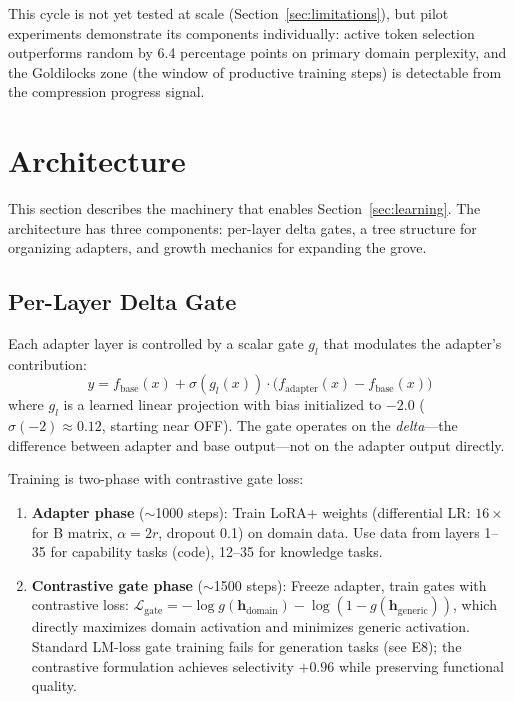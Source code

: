 \documentclass{article}
\begin{document}

This cycle is not yet tested at scale (Section~\ref{sec:limitations}),
but pilot experiments demonstrate its components individually: active
token selection outperforms random by 6.4 percentage points on primary
domain perplexity, and the Goldilocks zone (the window of productive
training steps) is detectable from the compression progress signal.

\section{Architecture}
\label{sec:architecture}

This section describes the machinery that enables Section~\ref{sec:learning}.
The architecture has three components: per-layer delta gates, a tree
structure for organizing adapters, and growth mechanics for expanding the
grove.

\subsection{Per-Layer Delta Gate}
\label{sec:delta-gate}

Each adapter layer is controlled by a scalar gate $g_l$ that modulates
the adapter's contribution:
\begin{equation}
\label{eq:delta-gate}
    y = f_{\text{base}}(x) + \sigma(g_l(x)) \cdot
    \bigl(f_{\text{adapter}}(x) - f_{\text{base}}(x)\bigr)
\end{equation}
where $g_l$ is a learned linear projection with bias initialized to
$-2.0$ ($\sigma(-2) \approx 0.12$, starting near OFF). The gate
operates on the \emph{delta}---the difference between adapter and base
output---not on the adapter output directly.

Training is two-phase with contrastive gate loss:
\begin{enumerate}[nosep,leftmargin=1.5em]
\item \textbf{Adapter phase} ($\sim$1000 steps): Train LoRA+ weights
      (differential LR: $16\times$ for B matrix, $\alpha = 2r$, dropout
      0.1) on domain data. Use data from layers 1--35 for capability
      tasks (code), 12--35 for knowledge tasks.
\item \textbf{Contrastive gate phase} ($\sim$1500 steps): Freeze adapter,
      train gates with contrastive loss:
      $\mathcal{L}_\text{gate} = -\log g(\mathbf{h}_\text{domain})
      - \log(1 - g(\mathbf{h}_\text{generic}))$,
      which directly maximizes domain activation and minimizes generic
      activation. Standard LM-loss gate training fails for generation
      tasks (see E8); the contrastive formulation achieves selectivity
      $+0.96$ while preserving functional quality.
\end{enumerate}
\end{document}
